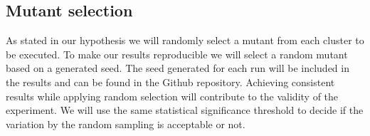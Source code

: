 \documentclass[../main]{subfiles}
\begin{document}
\subsection{Mutant selection}
As stated in our hypothesis we will randomly select a mutant from each cluster to be executed.
To make our results reproducible we will select a random mutant based on a generated seed.
The seed generated for each run will be included in the results and can be found in the Github repository\cite{rbasarat-repo}.
Achieving consistent results while applying random selection will contribute to the validity of the experiment.
We will use the same statistical significance threshold to decide if the variation by the random sampling is acceptable or not.
\end{document}
